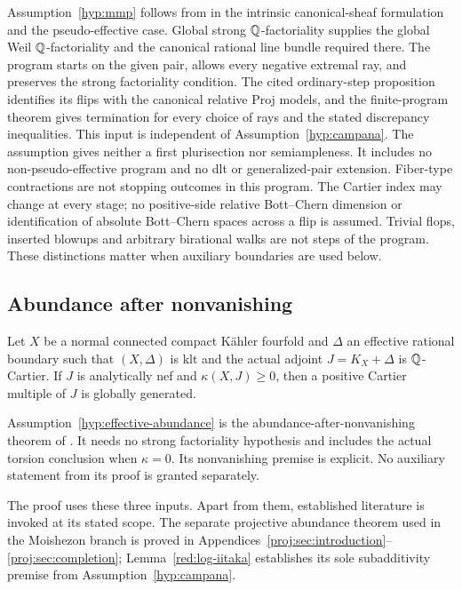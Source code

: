 Assumption~\ref{hyp:mmp} follows from
\cite[Theorem~6.24; Lemma~3.2; Propositions~3.4 and~6.23]{GrantMMP}
in the intrinsic canonical-sheaf formulation and the
pseudo-effective case. Global strong \(\mathbb{Q}\)-factoriality supplies
the global Weil \(\mathbb{Q}\)-factoriality and the canonical rational
line bundle required there. The program starts on the given pair,
allows every negative extremal ray, and preserves the strong
factoriality condition. The cited ordinary-step proposition identifies
its flips with the canonical relative Proj models, and the
finite-program theorem gives termination for every choice of rays
and the stated discrepancy inequalities.
This input is independent of Assumption~\ref{hyp:campana}.
The assumption gives neither a first plurisection
nor semiampleness. It includes no non-pseudo-effective program and
no dlt or generalized-pair extension. Fiber-type contractions are
not stopping outcomes in this program. The Cartier index may change
at every stage; no positive-side relative Bott--Chern dimension or
identification of absolute Bott--Chern spaces across a flip is
assumed. Trivial flops, inserted blowups and arbitrary birational
walks are not steps of the program. These distinctions matter when
auxiliary boundaries are used below.

\subsection{Abundance after nonvanishing}

\begin{assumption}
\label{hyp:effective-abundance}
Let \(X\) be a normal connected compact K\"ahler fourfold and
\(\Delta\) an effective rational boundary such that
\((X,\Delta)\) is klt and the actual adjoint
\(J=K_X+\Delta\) is \(\mathbb{Q}\)-Cartier. If \(J\) is analytically
nef and \(\kappa(X,J)\ge0\), then a positive Cartier multiple of
\(J\) is globally generated.
\end{assumption}

Assumption~\ref{hyp:effective-abundance} is the abundance-after-nonvanishing
theorem of \cite[Theorem~1.1]{GrantEffectiveAbundance}. It needs no strong
factoriality hypothesis and includes the actual torsion conclusion
when \(\kappa=0\). Its nonvanishing premise is explicit. No
auxiliary statement from its proof is granted separately.

The proof uses these three inputs. Apart from them, established
literature is invoked at its stated scope. The separate projective
abundance theorem used in the Moishezon branch is proved in
Appendices~\ref{proj:sec:introduction}--\ref{proj:sec:completion};
Lemma~\ref{red:log-iitaka} establishes its sole subadditivity premise
from Assumption~\ref{hyp:campana}.
